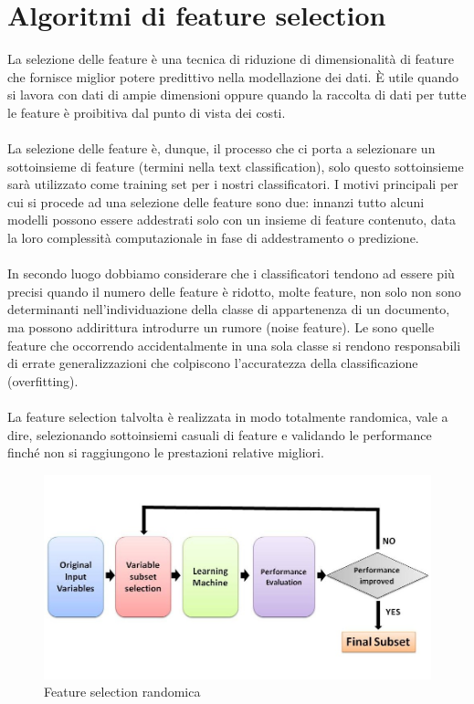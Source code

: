 \documentclass{article}
\theoremstyle{plain}
\theoremstyle{definition}
\begin{document}
\section{Algoritmi di feature selection}
La selezione delle feature è una tecnica di riduzione di dimensionalità di feature che fornisce miglior potere predittivo nella modellazione dei dati. È utile quando si lavora con dati di ampie dimensioni oppure quando la raccolta di dati per tutte le feature è proibitiva dal punto di vista dei costi.
\\
\\
La selezione delle feature è, dunque, il processo che ci porta a selezionare un sottoinsieme di feature (termini nella text classification), solo questo sottoinsieme sarà utilizzato come training set per i nostri classificatori. I motivi principali per cui si procede ad una selezione delle feature sono due: innanzi tutto alcuni modelli possono essere addestrati solo con un insieme di feature contenuto, data la loro complessità computazionale in fase di addestramento o predizione. 
\\
\\
In secondo luogo dobbiamo considerare che i classificatori tendono ad essere più precisi quando il numero delle feature è ridotto, molte feature, non solo non sono determinanti nell'individuazione della classe di appartenenza di un documento, ma possono addirittura introdurre un rumore (noise feature). Le  sono quelle feature che occorrendo accidentalmente in una sola classe si rendono responsabili di errate generalizzazioni che colpiscono l'accuratezza della classificazione (overfitting).
\\
\\
La feature selection talvolta è realizzata in modo totalmente randomica, vale a dire, selezionando sottoinsiemi casuali di feature e validando le performance finché non si raggiungono le prestazioni relative migliori.
\begin{figure}[htbp]
\begin{center}
\includegraphics[scale=0.70]{img/fs.jpeg}
\caption{Feature selection randomica}
\end{center}
\end{figure}
\end{document}
